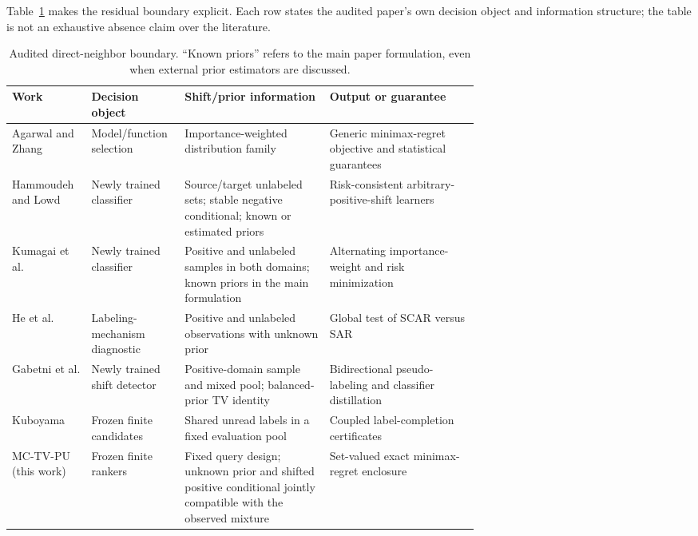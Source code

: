 \documentclass[preprint,review,12pt]{elsarticle}
\begin{document}
Table~\ref{tab:audited-neighbors} makes the residual boundary explicit. Each
row states the audited paper's own decision object and information structure;
the table is not an exhaustive absence claim over the literature.

\begin{table}[t]
\centering
\caption{Audited direct-neighbor boundary. ``Known priors'' refers to the main
paper formulation, even when external prior estimators are discussed.}
\label{tab:audited-neighbors}
\scriptsize
\setlength{\tabcolsep}{3pt}
\renewcommand{\arraystretch}{1.12}
\begin{tabularx}{\linewidth}{>{\raggedright\arraybackslash}p{0.17\linewidth}
  >{\raggedright\arraybackslash}p{0.20\linewidth}
  >{\raggedright\arraybackslash}p{0.31\linewidth}X}
\toprule
Work & Decision object & Shift/prior information & Output or guarantee \\
\midrule
Agarwal and Zhang \citep{agarwal2022minimax} & Model/function selection & Importance-weighted distribution family & Generic minimax-regret objective and statistical guarantees \\
Hammoudeh and Lowd \citep{hammoudeh2020arbitrary} & Newly trained classifier & Source/target unlabeled sets; stable negative conditional; known or estimated priors & Risk-consistent arbitrary-positive-shift learners \\
Kumagai et al. \citep{pmlr-v258-kumagai25a} & Newly trained classifier & Positive and unlabeled samples in both domains; known priors in the main formulation & Alternating importance-weight and risk minimization \\
He et al. \citep{he2026labeling} & Labeling-mechanism diagnostic & Positive and unlabeled observations with unknown prior & Global test of SCAR versus SAR \\
Gabetni et al. \citep{gabetni2026spuna} & Newly trained shift detector & Positive-domain sample and mixed pool; balanced-prior TV identity & Bidirectional pseudo-labeling and classifier distillation \\
Kuboyama \citep{kuboyama2026labelsdoesmodelchoice} & Frozen finite candidates & Shared unread labels in a fixed evaluation pool & Coupled label-completion certificates \\
MC-TV-PU (this work) & Frozen finite rankers & Fixed query design; unknown prior and shifted positive conditional jointly compatible with the observed mixture & Set-valued exact minimax-regret enclosure \\
\bottomrule
\end{tabularx}
\end{table}
\end{document}
